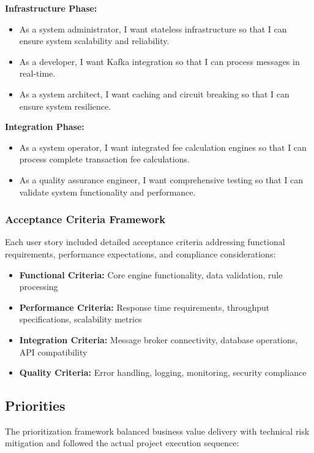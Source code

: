 \textbf{Infrastructure Phase:}
\begin{itemize}
    \item As a system administrator, I want stateless infrastructure so that I can ensure system scalability and reliability.
    \item As a developer, I want Kafka integration so that I can process messages in real-time.
    \item As a system architect, I want caching and circuit breaking so that I can ensure system resilience.
\end{itemize}

\textbf{Integration Phase:}
\begin{itemize}
    \item As a system operator, I want integrated fee calculation engines so that I can process complete transaction fee calculations.
    \item As a quality assurance engineer, I want comprehensive testing so that I can validate system functionality and performance.
\end{itemize}

\subsubsection{Acceptance Criteria Framework}

Each user story included detailed acceptance criteria addressing functional requirements, performance expectations, and compliance considerations:

\begin{itemize}
    \item \textbf{Functional Criteria:} Core engine functionality, data validation, rule processing
    \item \textbf{Performance Criteria:} Response time requirements, throughput specifications, scalability metrics
    \item \textbf{Integration Criteria:} Message broker connectivity, database operations, API compatibility
    \item \textbf{Quality Criteria:} Error handling, logging, monitoring, security compliance
\end{itemize}

\subsection{Priorities}

The prioritization framework balanced business value delivery with technical risk mitigation and followed the actual project execution sequence:

